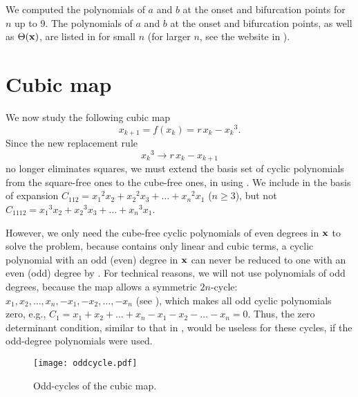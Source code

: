 \documentclass[preprint]{revtex4-1}
\begin{document}
We computed the polynomials of $a$ and $b$
  at the onset and bifurcation points for $n$ up to 9.
The polynomials of $a$ and $b$
  at the onset and bifurcation points,
  as well as $\Theta(\mathbf{x})$,
  are listed in  for small $n$
(for larger $n$, see the website in ).





\section{\label{sec:cubic}Cubic map}


We now study the following cubic map \cite{strogatz}
\begin{equation}
  x_{k + 1} = f(x_k) = r \, x_k - {x_k}^3.
\label{eq:cubic}
\end{equation}
Since the new replacement rule
\begin{equation}
  {x_k}^3 \rightarrow r \, x_k - x_{k+1}
\label{eq:cubreplace}
\end{equation}
no longer eliminates squares,
%
we must extend the basis set of cyclic polynomials
  from the square-free ones to the cube-free ones,
  in using .
We include in the basis of expansion
  $C_{112} = {x_1}^2 x_2 + {x_2}^2 x_3 + \dots + {x_n}^2 x_1$ ($n\ge3$),
but not
  $C_{1112} = {x_1}^3 x_2 + {x_2}^3 x_3 + \dots + {x_n}^3 x_1$.

%
However, we only need the cube-free cyclic polynomials of even degrees in $\mathbf{x}$
to solve the problem,
%
because  contains only linear and cubic terms,
a cyclic polynomial with an odd (even) degree in $\mathbf{x}$
can never be reduced to one with an even (odd) degree
by .
%
%
For technical reasons, we will not use polynomials of odd degrees,
because the map allows a symmetric $2n$-cycle:
$x_1, x_2, \ldots, x_n, -x_1, -x_2, \ldots, -x_n$
(see ),
which makes all odd cyclic polynomials zero,
e.g., $C_1 = x_1 + x_2 + \dots + x_n - x_1 - x_2 - \dots - x_n = 0$.
%
Thus, the zero determinant condition, similar to that in ,
  would be useless for these cycles,
  if the odd-degree polynomials were used.



\begin{figure}[h]
  \begin{minipage}{\linewidth}
    \begin{center}
        \texttt{[image: oddcycle.pdf]}
    \end{center}
  \end{minipage}%
  \caption{\label{fig:oddcycle}
  Odd-cycles of the cubic map.}
\end{figure}
\end{document}
